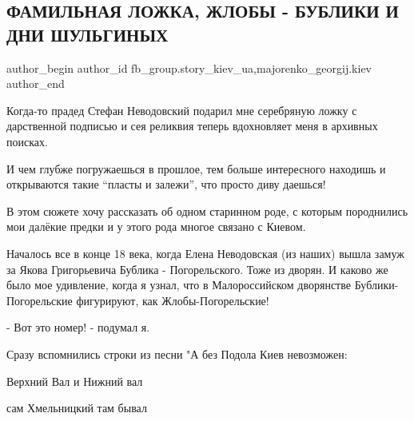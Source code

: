  
 
 
 
 
 
\subsection{ФАМИЛЬНАЯ ЛОЖКА, ЖЛОБЫ - БУБЛИКИ И ДНИ ШУЛЬГИНЫХ}
\label{sec:01_12_2021.fb.fb_group.story_kiev_ua.1.familnaja_lozhka}
 
\ifcmt
 author_begin
   author_id fb_group.story_kiev_ua,majorenko_georgij.kiev
 author_end
\fi



Когда-то прадед Стефан Неводовский подарил мне серебряную ложку с дарственной
подписью и сея реликвия теперь вдохновляет меня в архивных поисках.

И чем глубже погружаешься в прошлое, тем больше интересного находишь и
открываются такие \enquote{пласты и залежи}, что просто диву даешься!

В этом сюжете хочу рассказать об одном старинном роде, с которым породнились
мои далёкие предки и у этого рода многое связано с Киевом.


Началось все в конце 18 века, когда Елена Неводовская (из наших) вышла замуж за
Якова Григорьевича Бублика - Погорельского. Тоже из дворян. И каково же было
мое удивление, когда я узнал, что в Малороссийском дворянстве Бублики-
Погорельские фигурируют, как Жлобы-Погорельские!


- Вот это номер! - подумал я.

Сразу вспомнились строки из песни "А без Подола Киев невозможен:

Верхний Вал и Нижний вал

сам Хмельницкий там бывал

